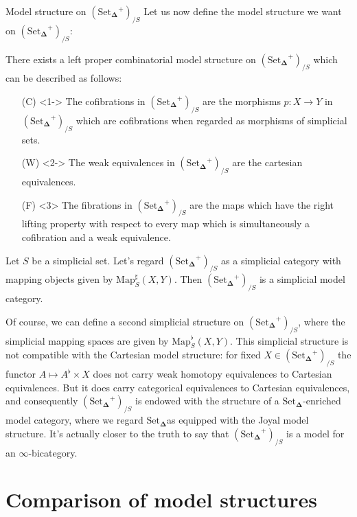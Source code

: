 \documentclass{beamer}[9pt]
\newcommand{\8}{\ensuremath{\infty}}
\newcommand{\SSet}{\ensuremath{\text{Set}_{\boldsymbol{\Delta}}}}
\newcommand{\Map}{\ensuremath{\text{Map}}}
\begin{document}
\begin{frame}{Model structure on $(\SSet^+)_{/S}$}
  Let us now define the model structure we want on $(\SSet^+)_{/S}$:

  There exists a left proper combinatorial model structure on $(\SSet^+)_{/S}$ which can be described as follows:
  \begin{itemize}
    \item[(C)]<1-> The cofibrations in $(\SSet^+)_{/S}$ are the morphisms $p: X \rightarrow Y$ in $(\SSet^+)_{/S}$ which are cofibrations when regarded as morphisms of simplicial sets.
    \item[(W)]<2-> The weak equivalences in $(\SSet^+)_{/S}$ are the cartesian equivalences.
    \item[(F)]<3> The fibrations in $(\SSet^+)_{/S}$ are the maps which have the right lifting property with respect to every map which is simultaneously a cofibration and a weak equivalence.
  \end{itemize}
\end{frame}

\begin{frame}
  Let $S$ be a simplicial set. Let's regard $(\SSet^+)_{/S}$ as a simplicial category with mapping objects given by $\Map^\sharp_S(X, Y)$. Then $(\SSet^+)_{/S}$ is a simplicial model category.

  Of course, we can define a second simplicial structure on $(\SSet^+)_{/S}$, where the simplicial mapping spaces are given by $\Map^\flat_S(X, Y)$. This simplicial structure is not compatible with the Cartesian model structure: for fixed $X \in (\SSet^+)_{/S}$ the functor $A\mapsto A^\flat\times X$ does not carry weak homotopy equivalences to Cartesian equivalences. But it does carry categorical equivalences to Cartesian equivalences, and consequently $(\SSet^+)_{/S}$ is endowed with the structure of a \SSet-enriched model category, where we regard \SSet as equipped with the Joyal model structure. It's actually closer to the truth to say that $(\SSet^+)_{/S}$ is a model for an \8-bicategory.
\end{frame}

\section{Comparison of model structures}
\end{document}
